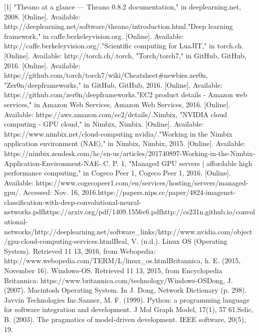 \documentclass{scrreprt}
\begin{document}
[1] "Theano at a glance — Theano 0.8.2 documentation," in deeplearning.net, 2008. [Online]. Available: http://deeplearning.net/software/theano/introduction.html.\newline
[2] "Deep learning framework," in caffe.berkeleyvision.org. [Online]. Available: http://caffe.berkeleyvision.org/.\newline
[3] "Scientific computing for LuaJIT," in torch.ch. [Online]. Available: http://torch.ch/.\newline
[4] 	torch, "Torch/torch7," in GitHub, GitHub, 2016. [Online]. Available: https://github.com/torch/torch7/wiki/Cheatsheet\#newbies.\newline
[5] zer0n, "Zer0n/deepframeworks," in GitHub, GitHub, 2016. [Online]. Available: https://github.com/zer0n/deepframeworks.\newline
[6] "EC2 product details - Amazon web services," in Amazon Web Services, Amazon Web Services, 2016. [Online]. Available: https://aws.amazon.com/ec2/details/.\newline
[7] Nimbix, "NVIDIA cloud computing - GPU cloud," in Nimbix, Nimbix. [Online]. Available: https://www.nimbix.net/cloud-computing nvidia/.\newline
[8] "Working in the Nimbix application environment (NAE)," in Nimbix, Nimbix, 2015. [Online]. Available: https://nimbix.zendesk.com/hc/en-us/articles/201740897-Working-in-the-Nimbix-Application-Environment-NAE-.\newline
[9] C. P. 1, "Managed GPU servers | affordable high performance computing," in Cogeco Peer 1, Cogeco Peer 1, 2016. [Online]. Available: https://www.cogecopeer1.com/en/services/hosting/servers/managed-gpu/. Accessed: Nov. 16, 2016.\newline
[10] \newline
[11] https://papers.nips.cc/paper/4824-imagenet-classification-with-deep-convolutional-neural-networks.pdf\newline
[12] https://arxiv.org/pdf/1409.1556v6.pdf\newline
[13] http://cs231n.github.io/convolutional-networks/\newline
[14] http://deeplearning.net/software_links/\newline
[15] http://www.nvidia.com/object/gpu-cloud-computing-services.html\newline
[16] Beal, V. (n.d.). Linux OS (Operating System). Retrieved 11 13, 2016, from Webopedia: http://www.webopedia.com/TERM/L/linux_os.html\newline
[17] Britannica, h. E. (2015, November 16). Windows-OS. Retrieved 11 13, 2015, from Encyclopedia Britannica: https://www.britannica.com/technology/Windows-OS\newline
[18] Dong, J. (2007). Macintosh Operating System. In J. Dong, Network Dictionary (p. 298). Javvin Technologies Inc.\newline
[19] Sanner, M. F. (1999). Python: a programming language for software integration and	development. J Mol Graph Model, 17(1), 57 61.\newline
[20] Selic, B. (2003). The pragmatics of model-driven development. IEEE software, 20(5), 19.\newline
\end{document}
